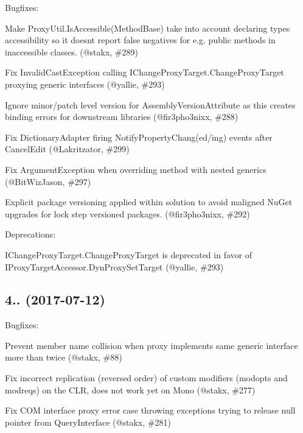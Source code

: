 Bugfixes\+:
\begin{DoxyItemize}
\item Make Proxy\+Util.\+Is\+Accessible(\+Method\+Base) take into account declaring type\textquotesingle{}s accessibility so it doesn\textquotesingle{}t report false negatives for e.\+g. public methods in inaccessible classes. (@stakx, \#289)
\item Fix Invalid\+Cast\+Exception calling I\+Change\+Proxy\+Target.\+Change\+Proxy\+Target proxying generic interfaces (@yallie, \#293)
\item Ignore minor/patch level version for Assembly\+Version\+Attribute as this creates binding errors for downstream libraries (@fir3pho3nixx, \#288)
\item Fix Dictionary\+Adapter firing Notify\+Property\+Chang(ed/ing) events after Cancel\+Edit (@\+Lakritzator, \#299)
\item Fix Argument\+Exception when overriding method with nested generics (@\+Bit\+Wiz\+Jason, \#297)
\item Explicit package versioning applied within solution to avoid maligned Nu\+Get upgrades for lock step versioned packages. (@fir3pho3nixx, \#292)
\end{DoxyItemize}

Deprecations\+:
\begin{DoxyItemize}
\item I\+Change\+Proxy\+Target.\+Change\+Proxy\+Target is deprecated in favor of I\+Proxy\+Target\+Accessor.\+Dyn\+Proxy\+Set\+Target (@yallie, \#293)
\end{DoxyItemize}

\subsection*{4.. (2017-\/07-\/12)}

Bugfixes\+:
\begin{DoxyItemize}
\item Prevent member name collision when proxy implements same generic interface more than twice (@stakx, \#88)
\item Fix incorrect replication (reversed order) of custom modifiers (modopts and modreqs) on the C\+LR, does not work yet on Mono (@stakx, \#277)
\item Fix C\+OM interface proxy error case throwing exceptions trying to release null pointer from Query\+Interface (@stakx, \#281)
\end{DoxyItemize}

